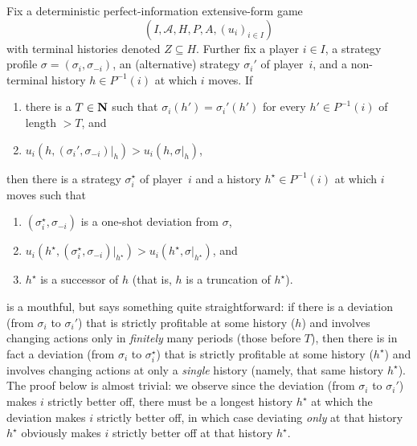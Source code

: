 \begin{lemma}
	\label{lemma:osdp_one_finite}
	Fix a deterministic perfect-information extensive-form game
	\begin{equation*}
		(I,\mathcal{A},H,P,A,(u_i)_{i \in I}) 
	\end{equation*}
	with terminal histories denoted $Z \subseteq H$. Further fix a player $i \in I$, a strategy profile $\sigma = (\sigma_i,\sigma_{-i})$, an (alternative) strategy $\sigma_i'$ of player~$i$, and a non-terminal history $h \in P^{-1}(i)$ at which $i$ moves.
	If
	
	\begin{enumerate}[label=(\roman*)]
	
		\item there is a $T \in \mathbf{N}$ such that $\sigma_i(h')=\sigma_i'(h')$ for every $h' \in P^{-1}(i)$ of length $> T$, and

		\item $u_i( h, (\sigma_i',\sigma_{-i})|_h ) > u_i( h, \sigma|_h )$,
	
	\end{enumerate}
	then there is a strategy $\sigma^\star_i$ of player~$i$ and a history $h^\star \in P^{-1}(i)$ at which $i$ moves
	such that

	\begin{enumerate}[label=(\Roman*)]
	
		\item $(\sigma^\star_i,\sigma_{-i})$ is a one-shot deviation from $\sigma$,

		\item $u_i( h^\star, (\sigma_i^\star,\sigma_{-i})|_{h^\star} ) > u_i( h^\star, \sigma|_{h^\star} )$, and

		\item $h^\star$ is a successor of $h$ (that is, $h$ is a truncation of $h^\star$).
	
	\end{enumerate}
\end{lemma}

 is a mouthful, but says something quite straightforward: if there is a deviation (from $\sigma_i$ to $\sigma_i'$) that is strictly profitable at some history ($h$) and involves changing actions only in \emph{finitely} many periods (those before $T$), then there is in fact a deviation (from $\sigma_i$ to $\sigma_i^\star$) that is strictly profitable at some history ($h^\star$) and involves changing actions at only a \emph{single} history (namely, that same history $h^\star$). The proof below is almost trivial: we observe since the deviation (from $\sigma_i$ to $\sigma_i'$) makes $i$ strictly better off, there must be a longest history $h^\star$ at which the deviation makes $i$ strictly better off, in which case deviating \emph{only} at that history $h^\star$ obviously makes $i$ strictly better off at that history $h^\star$.

